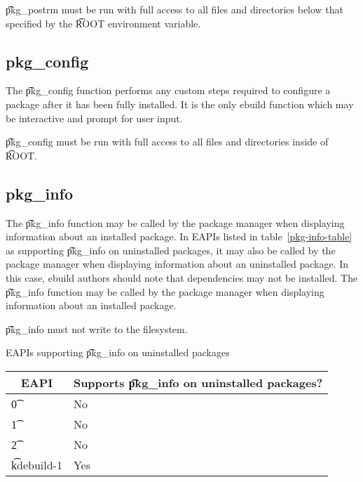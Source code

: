 \t{pkg\_postrm} must be run with full access to all files and directories below that specified by
the \t{ROOT} environment variable.

\subsection{pkg\_config}
\label{pkg-config-function}

The \t{pkg\_config} function performs any custom steps required to configure a package after it has been
fully installed. It is the only ebuild function which may be interactive and prompt for user input.

\t{pkg\_config} must be run with full access to all files and directories inside of \t{ROOT}.

\subsection{pkg\_info}
\label{pkg-info-function}

\IFKDEBUILDELSE
{
    The \t{pkg\_info} function may be called by the package manager when displaying information about an
    installed package. In EAPIs listed in table~\ref{pkg-info-table} as supporting \t{pkg\_info} on
    uninstalled packages, it may also be called by the package manager when displaying information
    about an uninstalled package. In this case, ebuild authors should note that dependencies may not be
    installed.
}{
    The \t{pkg\_info} function may be called by the package manager when displaying information about an
    installed package.
}

\t{pkg\_info} must not write to the filesystem.

\IFKDEBUILDELSE
{
    \begin{centertable}{EAPIs supporting \t{pkg\_info} on uninstalled packages} \label{pkg-info-table}
    \begin{tabular}{ l l }
        \toprule
        \multicolumn{1}{c}{\textbf{EAPI}} &
        \multicolumn{1}{c}{\textbf{Supports \t{pkg\_info} on uninstalled packages?}} \\
        \midrule
    \t{0} & No \\
    \t{1} & No \\
    \t{2} & No \\
    \t{kdebuild-1} & Yes \\
    \bottomrule
    \end{tabular}
    \end{centertable}
}{
}

